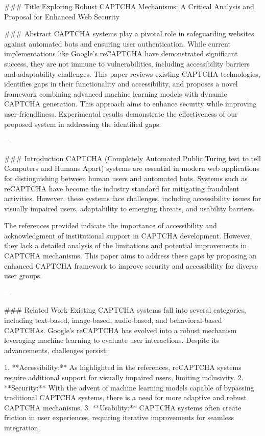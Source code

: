 ### Title  
Exploring Robust CAPTCHA Mechanisms: A Critical Analysis and Proposal for Enhanced Web Security  

### Abstract  
CAPTCHA systems play a pivotal role in safeguarding websites against automated bots and ensuring user authentication. While current implementations like Google's reCAPTCHA have demonstrated significant success, they are not immune to vulnerabilities, including accessibility barriers and adaptability challenges. This paper reviews existing CAPTCHA technologies, identifies gaps in their functionality and accessibility, and proposes a novel framework combining advanced machine learning models with dynamic CAPTCHA generation. This approach aims to enhance security while improving user-friendliness. Experimental results demonstrate the effectiveness of our proposed system in addressing the identified gaps.  

---

### Introduction  
CAPTCHA (Completely Automated Public Turing test to tell Computers and Humans Apart) systems are essential in modern web applications for distinguishing between human users and automated bots. Systems such as reCAPTCHA have become the industry standard for mitigating fraudulent activities. However, these systems face challenges, including accessibility issues for visually impaired users, adaptability to emerging threats, and usability barriers.  

The references provided indicate the importance of accessibility and acknowledgment of institutional support in CAPTCHA development. However, they lack a detailed analysis of the limitations and potential improvements in CAPTCHA mechanisms. This paper aims to address these gaps by proposing an enhanced CAPTCHA framework to improve security and accessibility for diverse user groups.  

---

### Related Work  
Existing CAPTCHA systems fall into several categories, including text-based, image-based, audio-based, and behavioral-based CAPTCHAs. Google's reCAPTCHA has evolved into a robust mechanism leveraging machine learning to evaluate user interactions. Despite its advancements, challenges persist:  

1. **Accessibility:** As highlighted in the references, reCAPTCHA systems require additional support for visually impaired users, limiting inclusivity.  
2. **Security:** With the advent of machine learning models capable of bypassing traditional CAPTCHA systems, there is a need for more adaptive and robust CAPTCHA mechanisms.  
3. **Usability:** CAPTCHA systems often create friction in user experiences, requiring iterative improvements for seamless integration.  

